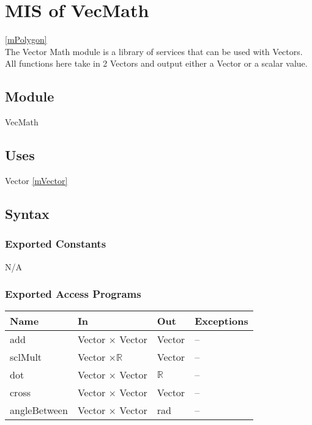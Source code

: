 \documentclass[12pt, titlepage]{article}
\begin{document}

\newpage

\section{MIS of VecMath} \ref{mPolygon} \\
The Vector Math module is a library of services that can be used with Vectors. 
All functions here take in 2 Vectors and output either a Vector or a scalar 
value.

\subsection{Module}
VecMath

\subsection{Uses}
Vector \ref{mVector}\\

\subsection{Syntax}
\subsubsection{Exported Constants}
N/A
\subsubsection{Exported Access Programs}
\begin{center}
	\begin{tabular}{p{4cm} p{2cm} p{2cm} p{4cm}}
		\hline
		\textbf{Name} & \textbf{In} & \textbf{Out} & \textbf{Exceptions} \\
		\hline
		add & Vector $\times$ Vector & Vector & -- \\
		sclMult & Vector $\times \mathbb{R}$ & Vector & -- \\ 
		dot & Vector $\times$ Vector & $\mathbb{R}$ & -- \\
		cross & Vector $\times$ Vector & Vector & -- \\
		angleBetween & Vector $\times$ Vector & rad & -- \\
		\hline
	\end{tabular}
\end{center}
\end{document}
